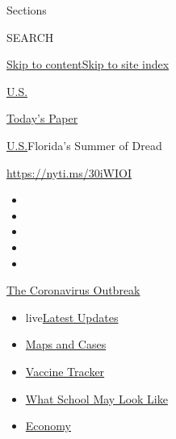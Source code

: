 Sections

SEARCH

\protect\hyperlink{site-content}{Skip to
content}\protect\hyperlink{site-index}{Skip to site index}

\href{https://www.nytimes.com/section/us}{U.S.}

\href{https://myaccount.nytimes.com/auth/login?response_type=cookie\&client_id=vi}{}

\href{https://www.nytimes.com/section/todayspaper}{Today's Paper}

\href{/section/us}{U.S.}\textbar{}Florida's Summer of Dread

\url{https://nyti.ms/30iWIOI}

\begin{itemize}
\item
\item
\item
\item
\item
\end{itemize}

\href{https://www.nytimes.com/news-event/coronavirus?action=click\&pgtype=Article\&state=default\&region=TOP_BANNER\&context=storylines_menu}{The
Coronavirus Outbreak}

\begin{itemize}
\tightlist
\item
  live\href{https://www.nytimes.com/2020/08/01/world/coronavirus-covid-19.html?action=click\&pgtype=Article\&state=default\&region=TOP_BANNER\&context=storylines_menu}{Latest
  Updates}
\item
  \href{https://www.nytimes.com/interactive/2020/us/coronavirus-us-cases.html?action=click\&pgtype=Article\&state=default\&region=TOP_BANNER\&context=storylines_menu}{Maps
  and Cases}
\item
  \href{https://www.nytimes.com/interactive/2020/science/coronavirus-vaccine-tracker.html?action=click\&pgtype=Article\&state=default\&region=TOP_BANNER\&context=storylines_menu}{Vaccine
  Tracker}
\item
  \href{https://www.nytimes.com/interactive/2020/07/29/us/schools-reopening-coronavirus.html?action=click\&pgtype=Article\&state=default\&region=TOP_BANNER\&context=storylines_menu}{What
  School May Look Like}
\item
  \href{https://www.nytimes.com/live/2020/07/31/business/stock-market-today-coronavirus?action=click\&pgtype=Article\&state=default\&region=TOP_BANNER\&context=storylines_menu}{Economy}
\end{itemize}

